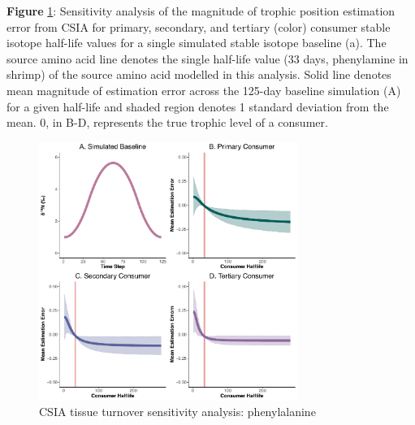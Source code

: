 \documentclass [11pt, proquest] {uwthesis}[2015/03/03]
\begin{document}
\textbf{Figure} \ref{fig:SensCSIAphe}: Sensitivity analysis of the
magnitude of trophic position estimation error from CSIA for primary,
secondary, and tertiary (color) consumer stable isotope half-life values
for a single simulated stable isotope baseline (a). The source amino
acid line denotes the single half-life value (33 days, phenylamine in
shrimp) of the source amino acid modelled in this analysis. Solid line
denotes mean magnitude of estimation error across the 125-day baseline
simulation (A) for a given half-life and shaded region denotes 1
standard deviation from the mean. 0, in B-D, represents the true trophic
level of a consumer. \newline
\begin{figure}[h]
\centering
  \includegraphics[width=0.75\textwidth]{figure/Ch5/Figure10.pdf}
  \caption{CSIA tissue turnover sensitivity analysis: phenylalanine}
  \label{fig:SensCSIAphe}
\end{figure}
\clearpage
\end{document}
